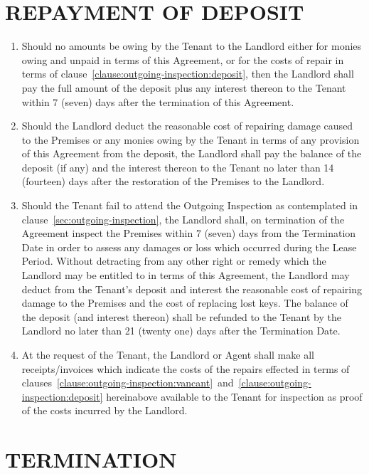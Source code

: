 \documentclass[11pt]{article}
\begin{document}
\section{\uppercase{repayment of deposit}}
\label{sec:repayment-of-deposit}

\begin{enumerate}
	\item Should no amounts be owing by the Tenant to the Landlord either for monies owing and unpaid in terms of this Agreement, or for the costs of repair in terms of clause~\ref{clause:outgoing-inspection:deposit}, then the Landlord shall pay the full amount of the deposit plus any interest thereon to the Tenant within 7 (seven) days after the termination of this Agreement.
	\item Should the Landlord deduct the reasonable cost of repairing damage caused to the Premises or any monies owing by the Tenant in terms of any provision of this Agreement from the deposit, the Landlord shall pay the balance of the deposit (if any) and the interest thereon to the Tenant no later than 14 (fourteen) days after the restoration of the Premises to the Landlord.
	\item Should the Tenant fail to attend the Outgoing Inspection as contemplated in clause~\ref{sec:outgoing-inspection}, the Landlord shall, on termination of the Agreement inspect the Premises within 7 (seven) days from the Termination Date in order to assess any damages or loss which occurred during the Lease Period. Without detracting from any other right or remedy which the Landlord may be entitled to in terms of this Agreement, the Landlord may deduct from the Tenant's deposit and interest the reasonable cost of repairing damage to the Premises and the cost of replacing lost keys. The balance of the deposit (and interest thereon) shall be refunded to the Tenant by the Landlord no later than 21 (twenty one) days after the Termination Date.
	\item At the request of the Tenant, the Landlord or Agent shall make all receipts/invoices which indicate the costs of the repairs effected in terms of clauses~\ref{clause:outgoing-inspection:vancant}~and~\ref{clause:outgoing-inspection:deposit} hereinabove available to the Tenant for inspection as proof of the costs incurred by the Landlord.
\end{enumerate}

\section{\uppercase{termination}}
\label{sec:termination}
\end{document}
